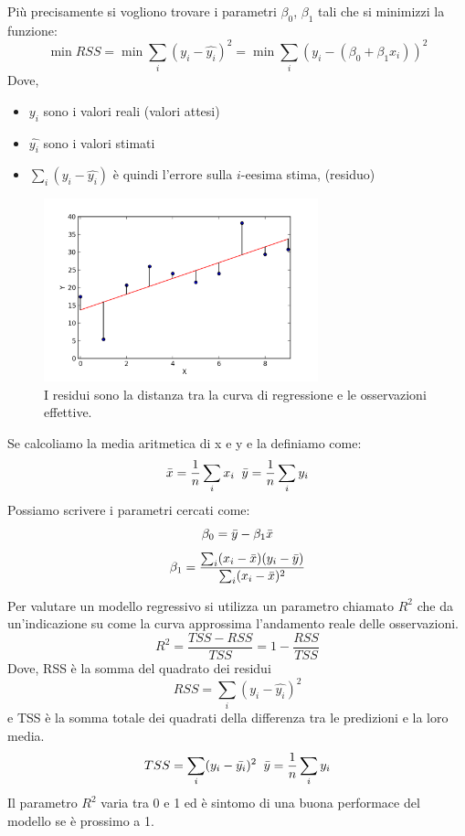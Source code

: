 \documentclass[12pt,a4paper,openright,twoside]{report}
\begin{document}
Più precisamente si vogliono trovare i parametri $\beta_{0}$, $\beta_{1}$ tali che si minimizzi la funzione: 
\begin{equation}
    \min{RSS} = \min{\sum_{i}(y_{i} - \hat{y_{i}})^2} = \min{\sum_{i}(y_{i}-(\beta_{0} + \beta_{1}x_{i}))^2}
\end{equation}
Dove, 
\begin{itemize}
    \item $y_{i}$ sono i valori reali (valori attesi)
    \item $\hat{y_{i}}$ sono i valori stimati
    \item $\sum_{i}(y_{i} - \hat{y_{i}})$ è quindi l'errore sulla $i$-eesima stima, (residuo)
\end{itemize}
\begin{center}
\begin{figure}[h]
\centering
\includegraphics[width=300px,keepaspectratio]{residual.png}
\caption{I residui sono la distanza tra la curva di regressione e le osservazioni effettive. }
\end{figure}    
\end{center}
Se calcoliamo la media aritmetica di x e y e la definiamo come:
    \begin{equation}
        \Bar{x} = \frac{1}{n} \sum_{i}x_{i} \;\; \Bar{y} = \frac{1}{n} \sum_{i}y_{i}
    \end{equation}
Possiamo scrivere i parametri cercati come: 
\begin{equation}
    \beta_{0} = \Bar{y} - \beta_{1}\Bar{x}
\end{equation}
\begin{equation}
    \beta_{1} = \frac{\sum_{i}(x_{i}-\Bar{x})(y_{i}-\Bar{y})}{\sum_{i}(x_{i}-\Bar{x})^2}
\end{equation}

Per valutare un modello regressivo si utilizza un parametro chiamato $R^2$ che da un'indicazione su come la curva approssima l'andamento reale delle osservazioni. 
\begin{equation}
    R^2 = \frac{TSS - RSS}{TSS} = 1- \frac{RSS}{TSS}
\end{equation}
Dove, RSS è la somma del quadrato dei residui
\begin{equation}
    RSS = \sum_{i}(y_{i} - \hat{y_{i}})^2
\end{equation}
e TSS è la somma totale dei quadrati della differenza tra le predizioni e la loro media.
\begin{equation}
        TSS = \sum_{i}(y_{i} - \Bar{y_{i}})^2 \; \;
    \Bar{y} = \frac{1}{n} \sum_{i}y_{i}
\end{equation}
Il parametro $R^2$ varia tra 0 e 1 ed è sintomo di una buona performace del modello se è prossimo a 1. 
\end{document}

